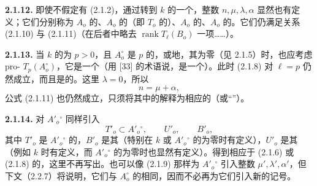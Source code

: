 \textbf{2.1.12.} 即使不假定有 (2.1.2)，通过转到 $k$ 的一个，整数 $n,\mu,\lambda,\alpha$ 显然也有定义；它们分别称为 $A_o$ 的、$A_o$ 的（即 $T_o$ 的）、$A_o$ 的、$A_o$ 的。它们仍满足关系 (2.1.10) 与 (2.1.11)（在后者中略去 $\operatorname{rank}T_\ell(B_o)$ 一项……）。

\textbf{2.1.13.} 当 $k$ 的为 $p>0$，且 $A_o^\circ$ 是 $p$ 的，或地，其为零（见 2.1.5）时，也应考虑 pro- $T_p(A_o^\circ)$，它是一个（用 [33] 的术语说，是一个）。此时 (2.1.8) 对 $\ell=p$ 仍然成立，而且是的。这里 $\lambda=0$，所以
\[n=\mu+\alpha,\tag{2.1.13.1}\]
公式 (2.1.11) 也仍然成立，只须将其中的解释为相应的（或“”）。

\textbf{2.1.14.} 对 $A'_o{}^\circ$ 同样引入
\[T'_o\subset A'_o{}^\circ,\qquad U'_o,\qquad B'_o,\]
其中 $T'_o$ 是 $A'_o{}^\circ$ 的，$B'_o$ 是其（特别在 $k$ 或 $A'_o{}^\circ$ 的为零时有定义），$U'_o$ 是其（例如 $k$ 时有定义，而 $A'_o{}^\circ$ 的为零时也显然有定义）。得到相应于 (2.1.6) 或 (2.1.8) 的，这里不再写出。也可以像 (2.1.9) 那样为 $A'_o{}^\circ$ 引入整数 $\mu',\lambda',\alpha'$，但下文（2.2.7）将说明，它们与 $A_o^\circ$ 的相同，因而不必再为它们引入新的记号。

